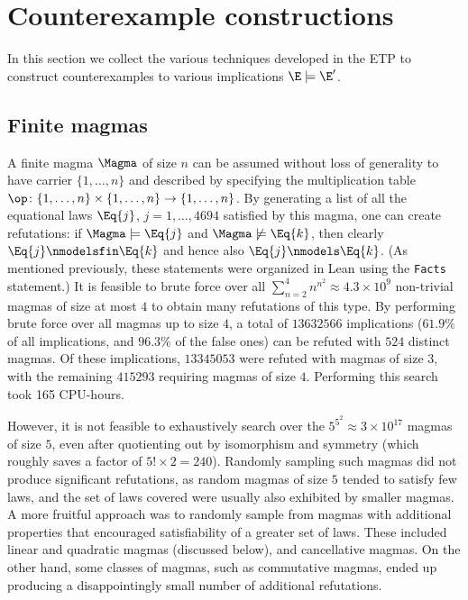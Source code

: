 
\section{Counterexample constructions}

In this section we collect the various techniques developed in the ETP to construct counterexamples to various implications $\E \models {\E'}$.

\subsection{Finite magmas}\label{finite-sec}

A finite magma $\Magma$ of size $n$ can be assumed without loss of generality to have carrier $\{1,\dots,n\}$ and described by specifying the multiplication table $\op \colon \{1,\dots,n\} \times \{1,\dots,n\} \to \{1,\dots,n\}$.  By generating a list of all the equational laws $\Eq{j}$, $j=1,\dots,4694$ satisfied by this magma, one can create refutations: if $\Magma \models \Eq{j}$ and $\Magma \not \models \Eq{k}$, then clearly $\Eq{j} \nmodelsfin \Eq{k}$ and hence also $\Eq{j} \nmodels \Eq{k}$.  (As mentioned previously, these statements were organized in Lean using the \texttt{Facts} statement.) It is feasible to brute force over all $\sum_{n=2}^4 n^{n^2} \approx 4.3 \times 10^9$ non-trivial magmas of size at most $4$ to obtain many refutations of this type.
By performing brute force over all magmas up to size $4$, a total of $\num{13632566}$ implications ($61.9\%$ of all implications, and $96.3\%$ of the false ones) can be refuted with $524$ distinct magmas. Of these implications, $\num{13345053}$ were refuted with magmas of size $3$, with the remaining $\num{415293}$ requiring magmas of size $4$. Performing this search took 165 CPU-hours.

However, it is not feasible to exhaustively search over the $5^{5^2} \approx 3 \times 10^{17}$ magmas of size $5$, even after quotienting out by isomorphism and symmetry (which roughly saves a factor of $5! \times 2 = 240$).  Randomly sampling such magmas did not produce significant refutations, as random magmas of size $5$ tended to satisfy few laws, and the set of laws covered were usually also exhibited by smaller magmas.  A more fruitful approach was to randomly sample from magmas with additional properties that encouraged satisfiability of a greater set of laws.  These included linear and quadratic magmas (discussed below), and cancellative magmas.  On the other hand, some classes of magmas, such as commutative magmas, ended up producing a disappointingly small number of additional refutations.

